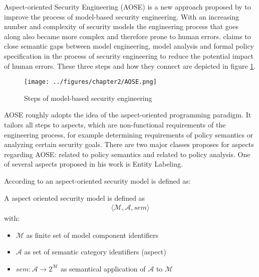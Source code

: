 \documentclass[twoside, openright, 12pt]{book}
\begin{document}
Aspect-oriented Security Engineering (AOSE) is a new approach proposed by \cite{Amthor18} to improve the process of model-based security engineering.
With an increasing number and complexity of security models the engineering process that goes along also became more complex and therefore prone to human errors.
\cite{Amthor18} claims to close semantic gaps between model engineering, model analysis and formal policy specification in the process of security engineering to reduce the potential impact of human errors.
These three steps and how they connect are depicted in figure \ref{fig:AOSE}.

\begin{figure}[htb]
	\centering
	\texttt{[image: ../figures/chapter2/AOSE.png]}
	\caption{Steps of model-based security engineering \citep{Amthor18}}
	\label{fig:AOSE}
\end{figure}

\noindent
AOSE roughly adopts the idea of the aspect-oriented programming paradigm.
It tailors all steps to aspects, which are non-functional requirements of the engineering process, for example determining requirements of policy semantics or analyzing certain security goals.
There are two major classes \cite{Amthor18} proposes for aspects regarding AOSE: related to policy semantics and related to policy analysis.
One of several aspects proposed in his work is Entity Labeling.

According to \cite{Amthor18} an aspect-oriented security model is defined as:

\begin{xdefinition} 
A aspect oriented security model is defined as 
\begin{gather*}
\langle \mathcal{M},\mathcal{A},sem \rangle
\end{gather*}
with:

\vspace{-2mm}
\begin{itemize}
\setlength\itemsep{0em}
\item $\mathcal{M}$ as finite set of model component identifiers
\item $\mathcal{A}$ as set of semantic category identifiers (aspect)
\item $sem : \mathcal{A} \rightarrow 2^\mathcal{M}$ as semantical application of $\mathcal{A}$ to $\mathcal{M}$
\end{itemize}
\label{definition:AOSE}
\end{xdefinition}
\end{document}
